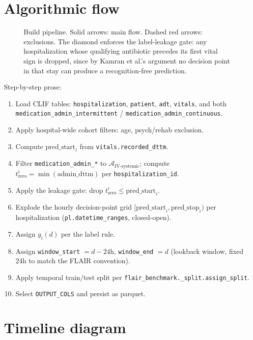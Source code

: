 \documentclass[11pt]{article}
\newcommand{\tzero}{t_{\text{zero}}}
\newcommand{\predstart}{\text{pred\_start}}
\newcommand{\predstop}{\text{pred\_stop}}
\begin{document}
\section{Algorithmic flow}
\label{sec:flow}

\begin{figure}[H]
\centering

\caption{Build pipeline. Solid arrows: main flow. Dashed red arrows:
exclusions. The diamond enforces the label-leakage gate: any
hospitalization whose qualifying antibiotic precedes its first vital
sign is dropped, since by Kamran et al.'s argument no decision point
in that stay can produce a recognition-free prediction.}
\label{fig:flow}
\end{figure}

Step-by-step prose:

\begin{enumerate}[leftmargin=2em]
  \item Load CLIF tables: \texttt{hospitalization}, \texttt{patient},
        \texttt{adt}, \texttt{vitals}, and both
        \texttt{medication\_admin\_intermittent} /
        \texttt{medication\_admin\_continuous}.
  \item Apply hospital-wide cohort filters: age, psych/rehab exclusion.
  \item Compute $\predstart_i$ from \texttt{vitals.recorded\_dttm}.
  \item Filter \texttt{medication\_admin\_*} to
        $\mathcal{A}_{\text{IV-systemic}}$; compute
        $\tzero^i = \min(\text{admin\_dttm})$ per
        \texttt{hospitalization\_id}.
  \item Apply the leakage gate: drop $\tzero^i \le \predstart_i$.
  \item Explode the hourly decision-point grid
        $[\predstart_i, \predstop_i)$ per hospitalization
        (\verb|pl.datetime_ranges|, closed-open).
  \item Assign $y_i(d)$ per the label rule.
  \item Assign \texttt{window\_start} $= d - 24\text{h}$,
        \texttt{window\_end} $= d$ (lookback window, fixed 24h to
        match the FLAIR convention).
  \item Apply temporal train/test split per
        \texttt{flair\_benchmark.\_split.assign\_split}.
  \item Select \texttt{OUTPUT\_COLS} and persist as parquet.
\end{enumerate}

\section{Timeline diagram}
\label{sec:timeline}
\end{document}
